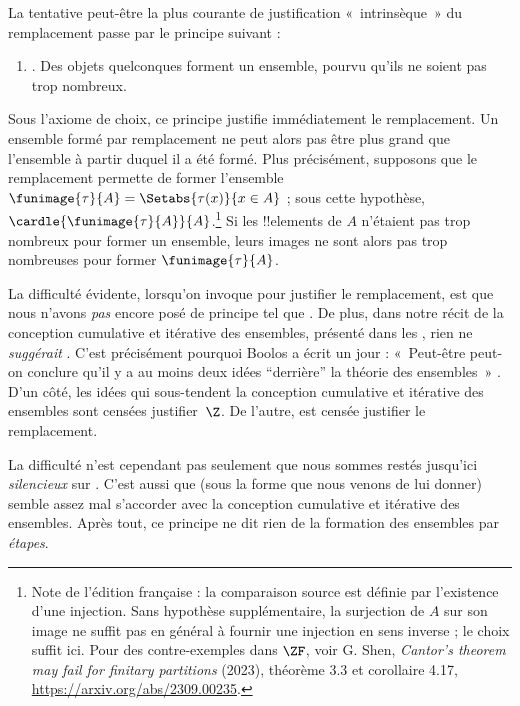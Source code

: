 \documentclass[../../../include/open-logic-section]{subfiles}
\begin{document}

La tentative peut-être la plus courante de justification
«~intrinsèque~» du remplacement passe par le principe suivant :
\begin{enumerate}
	\item[] \limofsize. Des objets quelconques forment un ensemble,
	pourvu qu'ils ne soient pas trop nombreux.
\end{enumerate}
Sous l'axiome de choix, ce principe justifie immédiatement le remplacement. Un ensemble formé par remplacement ne peut
alors pas être plus grand que l'ensemble à partir duquel il a été formé. Plus précisément, supposons
que le remplacement permette de former l'ensemble $\funimage{\tau}{A} = \Setabs{\tau(x)}{x \in A}$ ; sous cette hypothèse, $\cardle{\funimage{\tau}{A}}{A}$.\footnote{Note
de l'édition française : la comparaison source est définie par l'existence d'une injection. Sans hypothèse supplémentaire, la
surjection de $A$ sur son image ne suffit pas en général à fournir une injection en sens
inverse ; le choix suffit ici. Pour des contre-exemples dans $\ZF$, voir G. Shen, \emph{Cantor's theorem may
fail for finitary partitions} (2023), théorème 3.3 et corollaire 4.17, \url{https://arxiv.org/abs/2309.00235}.} Si les !!{element}s de $A$ n'étaient
pas trop nombreux pour former un ensemble, leurs images ne sont alors pas trop nombreuses pour former $\funimage{\tau}{A}$.

La difficulté évidente, lorsqu'on invoque \limofsize{} pour
justifier le remplacement, est que nous n'avons \emph{pas}
encore posé de principe tel que \limofsize. De plus, dans
notre récit de la conception cumulative et itérative des
ensembles, présenté dans les ,
rien ne \emph{suggérait} \limofsize. C'est précisément
pourquoi Boolos a écrit un jour : «~Peut-être peut-on conclure
qu'il y a au moins deux idées “derrière” la théorie des
ensembles~» \citeyearpar[p.~19]{Boolos1989}. D'un côté, les
idées qui sous-tendent la conception cumulative et itérative
des ensembles sont censées justifier~$\Z$. De l'autre,
\limofsize{} est censée justifier le remplacement.

La difficulté n'est cependant pas seulement que nous sommes
restés jusqu'ici \emph{silencieux} sur \limofsize. C'est aussi
que \limofsize{} (sous la forme que nous venons de lui donner)
semble assez mal s'accorder avec la conception cumulative et
itérative des ensembles. Après tout, ce principe ne dit rien
de la formation des ensembles par \emph{étapes}.
\end{document}
